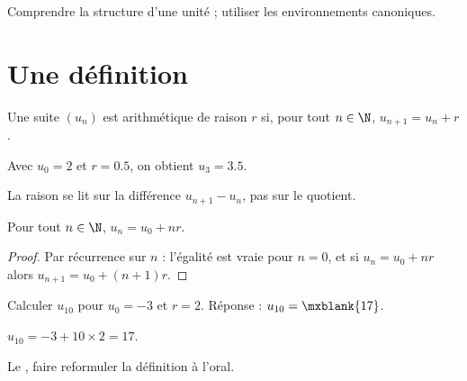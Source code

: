 \begin{objectives}
Comprendre la structure d'une unité ; utiliser les environnements canoniques.
\end{objectives}
\section{Une définition}
\begin{definition}
Une suite $(u_n)$ est arithmétique de raison $r$ si, pour tout $n\in\N$, $u_{n+1}=u_n+r$.
\end{definition}
\begin{example}
Avec $u_0=2$ et $r=\num{0,5}$, on obtient $u_3=\num{3,5}$. 
\end{example}
\begin{pitfall}
La raison se lit sur la différence $u_{n+1}-u_n$, pas sur le quotient.
\end{pitfall}
\begin{theorem}
Pour tout $n\in\N$, $u_n=u_0+nr$.
\end{theorem}
\begin{proof}
Par récurrence sur $n$ : l'égalité est vraie pour $n=0$, et si $u_n=u_0+nr$ alors $u_{n+1}=u_0+(n+1)r$.
\end{proof}
\begin{exercise}
Calculer $u_{10}$ pour $u_0=-3$ et $r=2$. Réponse : $u_{10}=\mxblank{17}$.
\end{exercise}
\begin{solution}
$u_{10}=-3+10\times2=17$.
\end{solution}
\begin{figurebox}
\end{figurebox}
\begin{teachernote}
Le , faire reformuler la définition à l'oral.
\end{teachernote}
